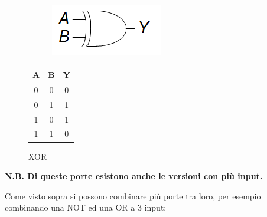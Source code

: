 \documentclass{article}
\begin{document}
\begin{itemize}
\begin{figure}[ht]
    \begin{minipage}[t]{0.49\textwidth}
        \centering
        \begin{figure}[H]
        \centering
        \includegraphics[width=.55\linewidth]{XOR.png}
        \end{figure}
        \label{fig:xor}
    \end{minipage}
    \begin{minipage}[t]{0.49\textwidth}
    \centering
        \begin{table}[H]
        \centering
        \begin{tabular}{cc|c}
            A & B & Y\\
            \hline
            0 & 0 & 0\\
            \hline
            0 & 1 & 1\\
            \hline
            1 & 0 & 1\\
            \hline
            1 & 1 & 0\\
        \end{tabular}
    \label{tab:xor}
    \end{table}
\end{minipage}
\caption{XOR}
\end{figure}

\end{itemize}

\textbf{N.B. Di queste porte esistono anche le versioni con più input.}\newline

Come visto sopra si possono combinare più porte tra loro, per esempio combinando una NOT ed una OR a 3 input:
\end{document}
